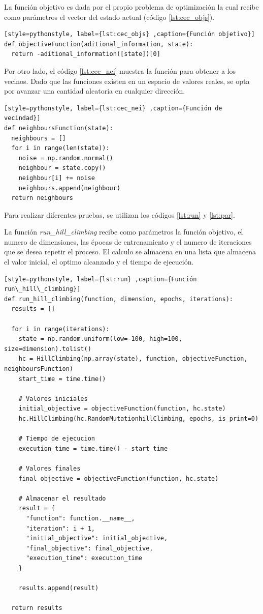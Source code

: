 \documentclass[12pt,twoside]{article}
\begin{document}
La función objetivo es dada por el propio problema de optimización la cual recibe como parámetros el vector del estado actual (código \ref{lst:cec_objs}).

\begin{lstlisting}[style=pythonstyle, label={lst:cec_objs} ,caption={Función objetivo}]
def objectiveFunction(aditional_information, state):
  return -aditional_information([state])[0]
\end{lstlisting}

Por otro lado, el código \ref{lst:cec_nei} muestra la función para obtener a los vecinos. Dado que las funciones existen en un espacio de valores reales, se opta por avanzar una cantidad aleatoria en cualquier dirección.

\begin{lstlisting}[style=pythonstyle, label={lst:cec_nei} ,caption={Función de vecindad}]
def neighboursFunction(state):
  neighbours = []
  for i in range(len(state)):
    noise = np.random.normal()
    neighbour = state.copy()
    neighbour[i] += noise
    neighbours.append(neighbour)
  return neighbours
\end{lstlisting}

Para realizar diferentes pruebas, se utilizan los códigos \ref{lst:run} y \ref{lst:par}. 

La función \textit{run\_hill\_climbing} recibe como parámetros la función objetivo, el numero de dimensiones, las épocas de entrenamiento y el numero de iteraciones que se desea repetir el proceso. El calculo se almacena en una lista que almacena el valor inicial, el optimo alcanzado y el tiempo de ejecución.

\begin{lstlisting}[style=pythonstyle, label={lst:run} ,caption={Función run\_hill\_climbing}]
def run_hill_climbing(function, dimension, epochs, iterations):
  results = []

  for i in range(iterations):
    state = np.random.uniform(low=-100, high=100, size=dimension).tolist()
    hc = HillClimbing(np.array(state), function, objectiveFunction, neighboursFunction)
    start_time = time.time()

    # Valores iniciales
    initial_objective = objectiveFunction(function, hc.state)
    hc.HillClimbing(hc.RandomMutationhillClimbing, epochs, is_print=0)

    # Tiempo de ejecucion    
    execution_time = time.time() - start_time

    # Valores finales
    final_objective = objectiveFunction(function, hc.state)

    # Almacenar el resultado
    result = {
	  "function": function.__name__,
	  "iteration": i + 1,
	  "initial_objective": initial_objective,
	  "final_objective": final_objective,
	  "execution_time": execution_time  
    }

    results.append(result)

  return results
\end{lstlisting}
\end{document}
